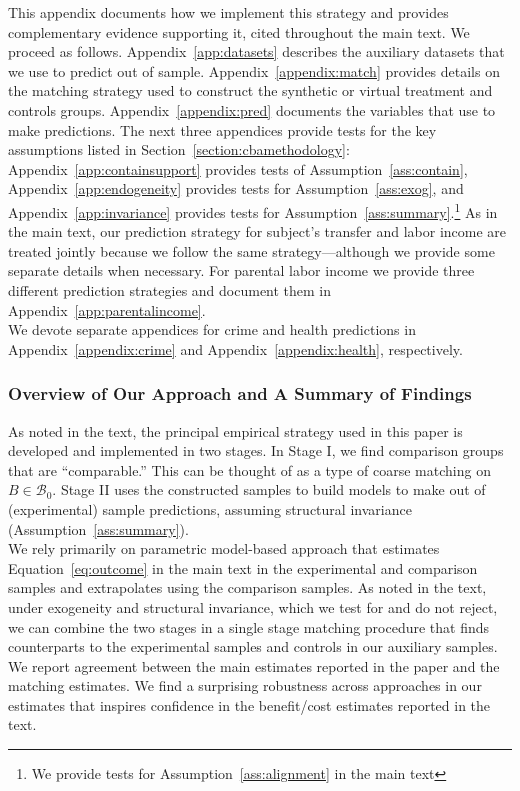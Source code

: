 \noindent This appendix documents how we implement this strategy and provides complementary evidence supporting it, cited throughout the main text. We proceed as follows. Appendix~\ref{app:datasets} describes the auxiliary datasets that we use to predict out of sample. Appendix~\ref{appendix:match} provides details on the matching strategy used to construct the synthetic or virtual treatment and controls groups. Appendix~\ref{appendix:pred} documents the variables that use to make predictions. The next three appendices provide tests for the key assumptions listed in Section~\ref{section:cbamethodology}: Appendix~\ref{app:containsupport} provides tests of Assumption~\ref{ass:contain}, Appendix~\ref{app:endogeneity} provides tests for Assumption~\ref{ass:exog}, and Appendix~\ref{app:invariance} provides tests for Assumption~\ref{ass:summary}.\footnote{We provide tests for Assumption~\ref{ass:alignment} in the main text} As in the main text, our prediction strategy for subject's transfer and labor income are treated jointly because we follow the same strategy---although we provide some separate details when necessary. For parental labor income we provide three different prediction strategies and document them in Appendix~\ref{app:parentalincome}.\\

\noindent We devote separate appendices for crime and health predictions in Appendix~\ref{appendix:crime} and Appendix~\ref{appendix:health}, respectively.

\subsubsection{Overview of Our Approach and A Summary of Findings}

\noindent As noted in the text, the principal empirical strategy used in this paper is developed and implemented in two stages. In Stage I, we find comparison groups that are ``comparable.'' This can be thought of as a type of coarse matching on $B \in \mathcal{B}_0$. Stage II uses the constructed samples to build models to make out of (experimental) sample predictions, assuming structural invariance (Assumption~\ref{ass:summary}). \\

\noindent We rely primarily on parametric model-based approach that estimates Equation~\eqref{eq:outcome} in the main text in the experimental and comparison samples and extrapolates using the comparison samples. As noted in the text, under exogeneity and structural invariance, which we test for and do not reject, we can combine the two stages in a single stage matching procedure that finds counterparts to the experimental samples and controls in our auxiliary samples. We report agreement between the main estimates reported in the paper and the matching estimates. We find a surprising robustness across approaches in our estimates that inspires confidence in the benefit/cost estimates reported in the text.\\

